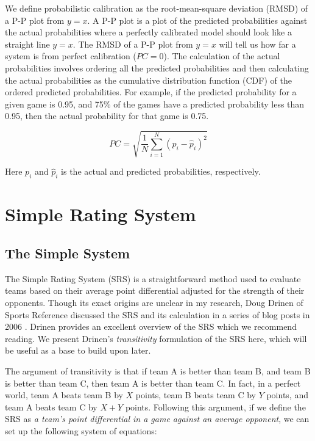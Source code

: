 \documentclass{report}
\begin{document}
\begin{enumerate}
    We define probabilistic calibration as the root-mean-square deviation (RMSD) of a P-P plot from $y=x$.
    A P-P plot is a plot of the predicted probabilities against the actual probabilities where a perfectly calibrated model should look like a straight line $y=x$.
    The RMSD of a P-P plot from $y=x$ will tell us how far a system is from perfect calibration ($PC=0$).
    The calculation of the actual probabilities involves ordering all the predicted probabilities and then calculating the actual probabilities as the cumulative distribution function (CDF) of the ordered predicted probabilities.
    For example, if the predicted probability for a given game is 0.95, and 75\% of the games have a predicted probability less than 0.95, then the actual probability for that game is 0.75.

    \begin{equation}
        PC=\sqrt{\frac{1}{N}\sum_{i=1}^{N}(p_i - \hat{p}_i)^2}
    \end{equation}

    Here $p_i$ and $\hat{p}_i$ is the actual and predicted probabilities, respectively.
\end{enumerate}

\chapter{Simple Rating System}

\section{The Simple System}

The Simple Rating System (SRS) is a straightforward method used to evaluate teams based on their average point differential adjusted for the strength of their opponents. 
Though its exact origins are unclear in my research, Doug Drinen of Sports Reference discussed the SRS and its calculation in a series of blog posts in 2006 \cite{drinen06-1,drinen06-2}.
Drinen provides an excellent overview of the SRS which we recommend reading.
We present Drinen's \textit{transitivity} formulation of the SRS here, which will be useful as a base to build upon later.

The argument of transitivity is that if team A is better than team B, and team B is better than team C, then team A is better than team C.
In fact, in a perfect world, team A beats team B by $X$ points, team B beats team C by $Y$ points, and team A beats team C by $X+Y$ points.
Following this argument, if we define the SRS as \textit{a team's point differential in a game against an average opponent}, we can set up the following system of equations:
\end{document}
